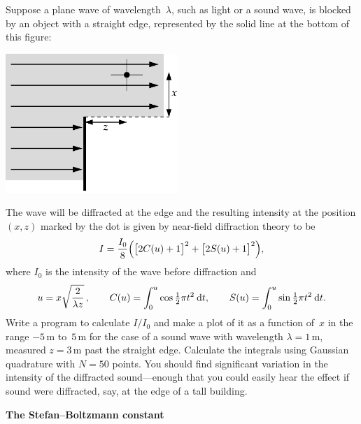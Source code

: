 \documentclass[12pt]{article}
\begin{document}
\begin{exercises}
\exercise Suppose a plane wave of wavelength~$\lambda$, such as light or a
sound wave, is blocked by an object with a straight edge, represented by
the solid line at the bottom of this figure: \medskip
\begin{center}
\includegraphics[width=6.5cm]{edge.eps}
\end{center}
The wave will be diffracted at the edge and the resulting intensity at the
position $(x,z)$ marked by the dot is given by near-field diffraction
theory to be
\begin{displaymath}
I = \frac{I_0}{8} \Bigl( \bigl[ 2C(u) + 1 \bigr]^2 +
                        \bigl[ 2S(u) + 1 \bigr]^2 \Bigr),
\end{displaymath}
where $I_0$ is the intensity of the wave before diffraction and
\begin{displaymath}
u = x \sqrt{2\over\lambda z}\,, \qquad
C(u) = \int_0^u \cos \tfrac12\pi t^2 \>\mathrm{d} t, \qquad
S(u) = \int_0^u \sin \tfrac12\pi t^2 \>\mathrm{d} t.
\end{displaymath}
Write a program to calculate $I/I_0$ and make a plot of it as a function
of~$x$ in the range $-5\,$m to~$5\,$m for the case of a sound wave with
wavelength $\lambda=1\,$m, measured $z=3\,$m past the straight edge.
Calculate the integrals using Gaussian quadrature with $N=50$ points.  You
should find significant variation in the intensity of the diffracted
sound---enough that you could easily hear the effect if sound were
diffracted, say, at the edge of a tall building.



\exercise \textbf{The Stefan--Boltzmann constant}


\end{exercises}
\end{document}
